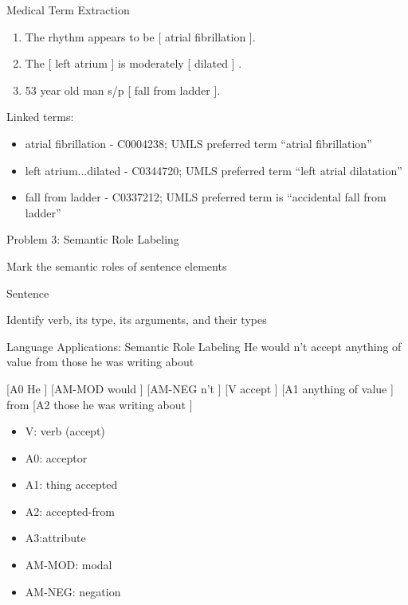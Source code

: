 \documentclass{beamer}
\begin{document}
\begin{frame}{Medical Term Extraction}

  \begin{enumerate}
  \item The rhythm appears to be [ \alert{atrial fibrillation} ].  
  \item The [ \alert{left atrium} ] is moderately [ \alert{dilated} ] .  
  \item 53 year old man s/p [ \alert{fall from ladder} ].
  \end{enumerate}

  Linked terms:
  \begin{itemize}
  \item atrial fibrillation - C0004238; UMLS preferred term ``atrial fibrillation''
  \item left atrium...dilated - C0344720; UMLS preferred term ``left atrial dilatation''
  \item fall from ladder - C0337212; UMLS preferred term is ``accidental fall from ladder''  
  \end{itemize}
\end{frame}


\begin{frame}{Problem 3: Semantic Role Labeling}
  \begin{description} \itemsep 20pt
  \item[Goal] Mark the semantic roles of sentence elements
  \item[Input] Sentence
  \item[Output] Identify verb, its type, its arguments, and their types
  \end{description}  
\end{frame}

\begin{frame}{Language Applications: Semantic Role Labeling }
 He  would  n't accept anything of value from those he was writing about  

 \air 

 [A0 He ] [AM-MOD would ] [AM-NEG n't ] [V accept ] [A1 anything of value ] from [A2 those he was writing about ] 

 \begin{itemize}
 \item V: verb (accept)
 \item A0: acceptor 
 \item A1: thing accepted 
 \item A2: accepted-from 
 \item A3:attribute 
 \item AM-MOD: modal 
 \item  AM-NEG: negation
 \end{itemize}
\end{frame}
\end{document}
